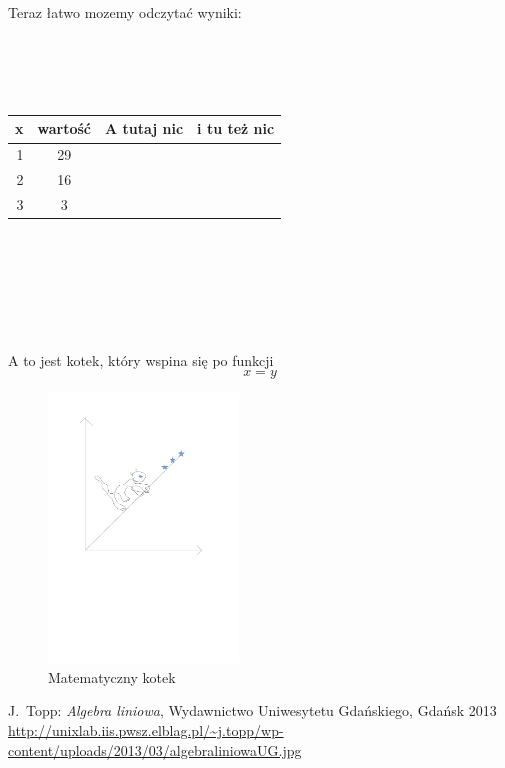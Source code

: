 \documentclass[13pt, a4paper, titlepage]{article}
\begin{document}
\newpage

Teraz łatwo mozemy odczytać wyniki:
\\\\\\\\\\
\begin{tabular}{|r|c|c|c|}
\hline
x & wartość & A tutaj nic  & i tu też nic\\ \hline
                  
1 &  29 &   &     \\ \hline

2 &  16 &   &     \\ \hline

3 &  3  &   &     \\ \hline
\end{tabular}
\\\\\\\\\\\\
A to jest kotek, który wspina się po funkcji \begin{equation}x=y\end{equation}
\begin{figure}[!ht]
	\centering
		\includegraphics[width=0.45\textwidth]{kotek.pdf}
	\caption{Matematyczny kotek}
	\label{fig:kotek}
\end{figure}


\newpage
{}
\begin{thebibliography}{99}
 J.~Topp:
\emph{Algebra liniowa},
Wydawnictwo Uniwesytetu Gdańskiego, Gdańsk 2013
\\
\url{http://unixlab.iis.pwsz.elblag.pl/~j.topp/wp-content/uploads/2013/03/algebraliniowaUG.jpg}
\end{thebibliography}
                    
\end{document}
